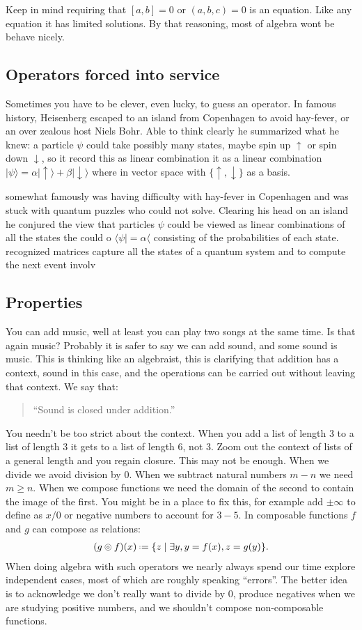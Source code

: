 Keep in mind requiring that $[a,b]=0$ or $(a,b,c)=0$ is an equation. 
Like any equation it has limited solutions.  By that reasoning, 
most of algebra wont be behave nicely.  

\subsection{Operators forced into service}
Sometimes you have to be clever, even lucky, to guess an operator.
In famous history, Heisenberg escaped to an island from Copenhagen 
to avoid hay-fever, or an over zealous host Niels Bohr. 
Able to think clearly he summarized what he knew: a particle $\psi$
could take possibly many states, maybe spin up $\uparrow$ or spin down 
$\downarrow$, so it record this as linear combination
it as a linear combination $|\psi\rangle = \alpha|\uparrow\rangle+\beta|\downarrow\rangle$
where in vector space with $\{\uparrow,\downarrow\}$ as a basis. 

somewhat famously 
was having difficulty with hay-fever in Copenhagen and was stuck with 
quantum puzzles who could not solve. Clearing his head on an island 
he conjured the view that particles $\psi$ could be viewed as linear 
combinations of all the states the could o
$\langle \psi|=\alpha \langle $ consisting of the probabilities of each state.
recognized matrices capture all the states of a quantum system and 
to compute the next event involv


\subsection{Properties}
You can add music, well at least you can play two songs at the same time.
Is that again music?  Probably it is safer to say we can add sound, and 
some sound is music.  This is thinking like an algebraist, this is 
clarifying that addition has a context, sound in this case,
and the operations can be carried out without leaving that context.
We say that:
\begin{quote}
    ``Sound is closed under addition.''
\end{quote}
You needn't be too strict about the context.
When you add a list of length 3 to a 
list of length 3 it gets to a list of length 6, not 3.
Zoom out the context of lists of a general length and 
you regain closure.  This may not be enough.  When we divide 
we avoid division by $0$.  When we subtract natural numbers $m-n$
we need $m\geq n$.  When we compose functions we need the 
domain of the second to contain the image of the first.
You might be in a place to fix this, for example add $\pm\infty$ 
to define as $x/0$ or negative numbers to account for $3-5$.
In composable functions $f$ and $g$ can compose as relations:
\begin{align*}
    (g\circledcirc f)(x) \defeq \{z\mid \exists y, y=f(x), z=g(y)\}.
\end{align*}
When doing algebra with such operators we nearly always spend 
our time explore independent cases, most of which are 
roughly speaking ``errors''.  The better idea is to acknowledge 
we don't really want to divide by 0, produce negatives when we 
are studying positive numbers, and we shouldn't compose 
non-composable functions.


